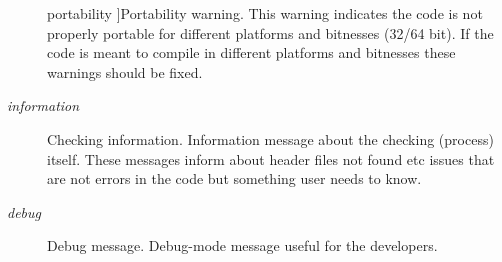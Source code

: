 \begin{Desc}
\begin{description}
{\hypertarget{class_severity_ac185938ae084355bbf1790cf1a70caa6a427317a70b865d896d74e8138c44c155}{portability}\label{class_severity_ac185938ae084355bbf1790cf1a70caa6a427317a70b865d896d74e8138c44c155}
}]Portability warning. This warning indicates the code is not properly portable for different platforms and bitnesses (32/64 bit). If the code is meant to compile in different platforms and bitnesses these warnings should be fixed. \item[{\em 
\hypertarget{class_severity_ac185938ae084355bbf1790cf1a70caa6a06fc099ae2ca799fe56959a600d511cc}{information}\label{class_severity_ac185938ae084355bbf1790cf1a70caa6a06fc099ae2ca799fe56959a600d511cc}
}]Checking information. Information message about the checking (process) itself. These messages inform about header files not found etc issues that are not errors in the code but something user needs to know. \item[{\em 
\hypertarget{class_severity_ac185938ae084355bbf1790cf1a70caa6a3a8aba6160588f90edf01c2131df491e}{debug}\label{class_severity_ac185938ae084355bbf1790cf1a70caa6a3a8aba6160588f90edf01c2131df491e}
}]Debug message. Debug-\/mode message useful for the developers. \end{description}
\end{Desc}



